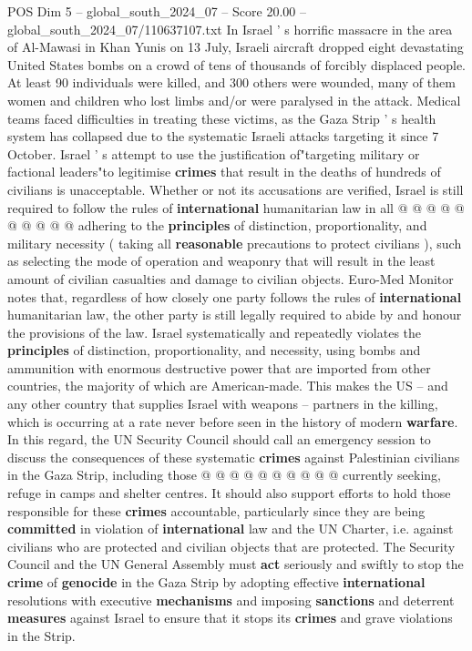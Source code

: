 \begin{textsample}{POS Dim 5 – global\_south\_2024\_07 – Score 20.00 – global\_south\_2024\_07/110637107.txt}
In Israel ' s horrific massacre in the area of Al-Mawasi in Khan Yunis on 13 July, Israeli aircraft dropped eight devastating United States bombs on a crowd of tens of thousands of forcibly displaced people.
At least 90 individuals were killed, and 300 others were wounded, many of them women and children who lost limbs and/or were paralysed in the attack.
Medical teams faced difficulties in treating these victims, as the Gaza Strip ' s health system has collapsed due to the systematic Israeli attacks targeting it since 7 October.
Israel ' s attempt to use the justification of"targeting military or factional leaders"to legitimise \textbf{crimes} that result in the deaths of hundreds of civilians is unacceptable.
Whether or not its accusations are verified, Israel is still required to follow the rules of \textbf{international} humanitarian law in all @ @ @ @ @ @ @ @ @ @ adhering to the \textbf{principles} of distinction, proportionality, and military necessity ( taking all \textbf{reasonable} precautions to protect civilians ), such as selecting the mode of operation and weaponry that will result in the least amount of civilian casualties and damage to civilian objects.
Euro-Med Monitor notes that, regardless of how closely one party follows the rules of \textbf{international} humanitarian law, the other party is still legally required to abide by and honour the provisions of the law.
Israel systematically and repeatedly violates the \textbf{principles} of distinction, proportionality, and necessity, using bombs and ammunition with enormous destructive power that are imported from other countries, the majority of which are American-made.
This makes the US -- and any other country that supplies Israel with weapons -- partners in the killing, which is occurring at a rate never before seen in the history of modern \textbf{warfare}.
In this regard, the UN Security Council should call an emergency session to discuss the consequences of these systematic \textbf{crimes} against Palestinian civilians in the Gaza Strip, including those @ @ @ @ @ @ @ @ @ @ currently seeking, refuge in camps and shelter centres.
It should also support efforts to hold those responsible for these \textbf{crimes} accountable, particularly since they are being \textbf{committed} in violation of \textbf{international} law and the UN Charter, i.e. against civilians who are protected and civilian objects that are protected.
The Security Council and the UN General Assembly must \textbf{act} seriously and swiftly to stop the \textbf{crime} of \textbf{genocide} in the Gaza Strip by adopting effective \textbf{international} resolutions with executive \textbf{mechanisms} and imposing \textbf{sanctions} and deterrent \textbf{measures} against Israel to ensure that it stops its \textbf{crimes} and grave violations in the Strip.

\end{textsample}
